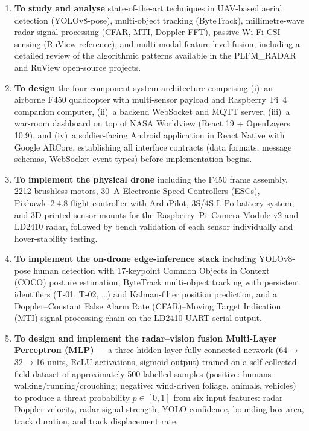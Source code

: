 \begin{enumerate}[label=\textbf{O\arabic*.}, leftmargin=*, itemsep=4pt]

    \item \textbf{To study and analyse} state-of-the-art techniques in UAV-based aerial detection (YOLOv8-pose), multi-object tracking (ByteTrack), millimetre-wave radar signal processing (CFAR, MTI, Doppler-FFT), passive Wi-Fi CSI sensing (RuView reference), and multi-modal feature-level fusion, including a detailed review of the algorithmic patterns available in the PLFM\_RADAR and RuView open-source projects.

    \item \textbf{To design} the four-component system architecture comprising (i)~an airborne F450 quadcopter with multi-sensor payload and Raspberry~Pi~4 companion computer, (ii)~a backend WebSocket and MQTT server, (iii)~a war-room dashboard on top of NASA Worldview (React 19 + OpenLayers 10.9), and (iv)~a soldier-facing Android application in React Native with Google ARCore, establishing all interface contracts (data formats, message schemas, WebSocket event types) before implementation begins.

    \item \textbf{To implement the physical drone} including the F450 frame assembly, 2212 brushless motors, 30~A Electronic Speed Controllers (ESCs), Pixhawk~2.4.8 flight controller with ArduPilot, 3S/4S LiPo battery system, and 3D-printed sensor mounts for the Raspberry~Pi~Camera Module v2 and LD2410 radar, followed by bench validation of each sensor individually and hover-stability testing.

    \item \textbf{To implement the on-drone edge-inference stack} including YOLOv8-pose human detection with 17-keypoint Common Objects in Context (COCO) posture estimation, ByteTrack multi-object tracking with persistent identifiers (T-01, T-02, \ldots) and Kalman-filter position prediction, and a Doppler--Constant False Alarm Rate (CFAR)--Moving Target Indication (MTI) signal-processing chain on the LD2410 UART serial output.

    \item \textbf{To design and implement the radar--vision fusion Multi-Layer Perceptron (MLP)} --- a three-hidden-layer fully-connected network (64$\to$32$\to$16 units, ReLU activations, sigmoid output) trained on a self-collected field dataset of approximately 500 labelled samples (positive: humans walking/running/crouching; negative: wind-driven foliage, animals, vehicles) to produce a threat probability $p \in [0, 1]$ from six input features: radar Doppler velocity, radar signal strength, YOLO confidence, bounding-box area, track duration, and track displacement rate.


\end{enumerate}
